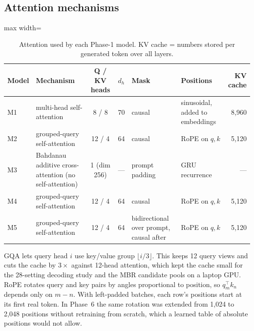 \documentclass[11pt, oneside]{article}
\begin{document}
\subsection{Attention mechanisms}
\begin{table}[H]
\centering\scriptsize
\caption{Attention used by each Phase-1 model. KV cache = numbers stored per generated token over all layers.}
\label{tab:attn}
\begin{adjustbox}{max width=\textwidth}
\begin{tabular}{llccllr}
\toprule
Model & Mechanism & Q / KV heads & $d_h$ & Mask & Positions & KV cache\\
\midrule
M1 & multi-head self-attention & 8 / 8 & 70 & causal & sinusoidal, added to embeddings & 8{,}960\\
M2 & grouped-query self-attention & 12 / 4 & 64 & causal & RoPE on $q,k$ & 5{,}120\\
M3 & Bahdanau additive cross-attention (no self-attention) & 1 (dim 256) & --- & prompt padding & GRU recurrence & ---\\
M4 & grouped-query self-attention & 12 / 4 & 64 & causal & RoPE on $q,k$ & 5{,}120\\
M5 & grouped-query self-attention & 12 / 4 & 64 & bidirectional over prompt, causal after & RoPE on $q,k$ & 5{,}120\\
\bottomrule
\end{tabular}
\end{adjustbox}
\end{table}
\noindent GQA lets query head $i$ use key/value group $\lfloor i/3\rfloor$. This keeps 12 query views and cuts the
cache by $3\times$ against 12-head attention, which kept the cache small for the 28-setting decoding study and the MBR
candidate pools on a laptop GPU. RoPE rotates query and key pairs by angles proportional to position, so $q_m^\top k_n$ depends only on
$m-n$. With left-padded batches, each row's positions start at its first real token. In Phase~6 the same rotation was
extended from 1{,}024 to 2{,}048 positions without retraining from scratch, which a learned table of absolute positions
would not allow.
\end{document}
